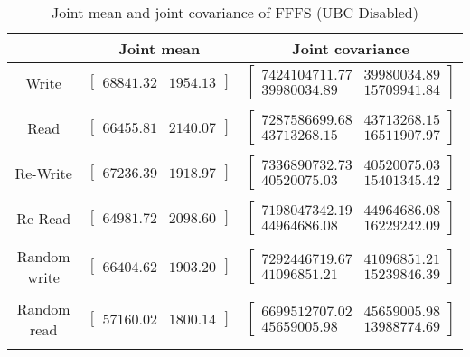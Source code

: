 
	\begin{table}
	\caption{Joint mean and joint covariance of FFFS (UBC Disabled)}
	\begin{tabular}{| c | c | c |}
	\hline
	{} & \textbf{Joint mean} & \textbf{Joint covariance}\\
	\hline
	\hline
Write & $\left[ \begin{array}{rr} 68841.32 & 1954.13 \end{array}\right] $ & $\left[ \begin{array}{rr} 7424104711.77 & 39980034.89 \\ 39980034.89 & 15709941.84 \end{array}\right] $\\ 
{} & {} & {} \\ 
Read & $\left[ \begin{array}{rr} 66455.81 & 2140.07 \end{array}\right] $ & $\left[ \begin{array}{rr} 7287586699.68 & 43713268.15 \\ 43713268.15 & 16511907.97 \end{array}\right] $\\ 
{} & {} & {} \\ 
Re-Write & $\left[ \begin{array}{rr} 67236.39 & 1918.97 \end{array}\right] $ & $\left[ \begin{array}{rr} 7336890732.73 & 40520075.03 \\ 40520075.03 & 15401345.42 \end{array}\right] $\\ 
{} & {} & {} \\ 
Re-Read & $\left[ \begin{array}{rr} 64981.72 & 2098.60 \end{array}\right] $ & $\left[ \begin{array}{rr} 7198047342.19 & 44964686.08 \\ 44964686.08 & 16229242.09 \end{array}\right] $\\ 
{} & {} & {} \\ 
Random write & $\left[ \begin{array}{rr} 66404.62 & 1903.20 \end{array}\right] $ & $\left[ \begin{array}{rr} 7292446719.67 & 41096851.21 \\ 41096851.21 & 15239846.39 \end{array}\right] $\\ 
{} & {} & {} \\ 
Random read & $\left[ \begin{array}{rr} 57160.02 & 1800.14 \end{array}\right] $ & $\left[ \begin{array}{rr} 6699512707.02 & 45659005.98 \\ 45659005.98 & 13988774.69 \end{array}\right] $\\ 
{} & {} & {} \\ 

	\hline
	\end{tabular}
	\label{tbl:stat-fffs_ubc_disabled}
	\end{table}
